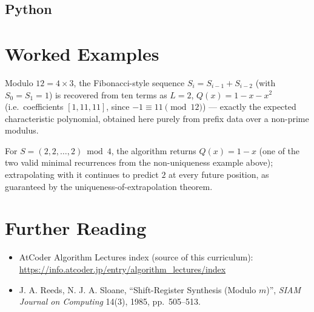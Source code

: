 \documentclass[11pt]{article}
\begin{document}
\subsection{Python}

\section{Worked Examples}
\begin{examplebox}
Modulo $12 = 4 \times 3$, the Fibonacci-style sequence
$S_i = S_{i-1} + S_{i-2}$ (with $S_0 = S_1 = 1$) is recovered from ten terms
as $L = 2$, $Q(x) = 1 - x - x^2$ (i.e.\ coefficients $[1, 11, 11]$, since
$-1 \equiv 11 \pmod{12}$) --- exactly the expected characteristic
polynomial, obtained here purely from prefix data over a non-prime modulus.

For $S = (2,2,\ldots,2) \bmod 4$, the algorithm returns $Q(x) = 1 - x$ (one
of the two valid minimal recurrences from the non-uniqueness example above);
extrapolating with it continues to predict $2$ at every future position, as
guaranteed by the uniqueness-of-extrapolation theorem.
\end{examplebox}

\section{Further Reading}
\begin{itemize}[leftmargin=1.5em]
  \item AtCoder Algorithm Lectures index (source of this curriculum):
        \url{https://info.atcoder.jp/entry/algorithm_lectures/index}
  \item J. A. Reeds, N. J. A. Sloane, ``Shift-Register Synthesis (Modulo
        $m$)'', \emph{SIAM Journal on Computing} 14(3), 1985, pp.\ 505--513.
\end{itemize}
\end{document}
